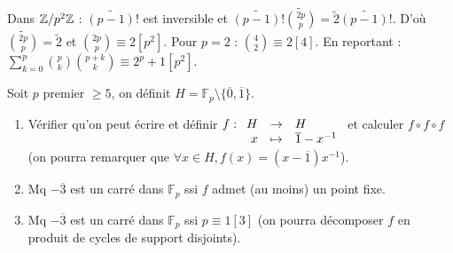 \begin{solution}
Dans $\mathbb Z/p^2\mathbb Z$ : $\widetilde{(p-1)!}$ est inversible et $\widetilde{(p-1)!} \widetilde{\binom{2p}{p}} = \widetilde{2} \widetilde{(p-1)!}$.
D'où $\widetilde{\binom{2p}{p}} = \widetilde{2}$ et $\binom{2p}{p} \equiv 2 [p^2]$.
Pour $p=2$ : $\binom{4}{2} \equiv 2 [4]$.
En reportant : $\boxed{\sum_{k=0}^p \binom{p}{k}\binom{p+k}{k} \equiv 2^p + 1 [p^2]}$.
\end{solution}


\begin{statementbox}
Soit $p$ premier $\geq 5$, on définit $H = \mathbb{F}_p \setminus \{\overline{0}, \overline{1}\}$.
\begin{enumerate}[label=\alph*)]
  \item Vérifier qu'on peut écrire et définir $f : \begin{array}[t]{rcl} H & \to & H \\ x & \mapsto & \overline{1} - x^{-1} \end{array}$ et calculer $f \circ f \circ f$ (on pourra remarquer que $\forall x \in H, f(x) = (x - \overline{1})x^{-1}$).
  \item Mq $-\overline{3}$ est un carré dans $\mathbb{F}_p$ ssi $f$ admet (au moins) un point fixe.
  \item Mq $-\overline{3}$ est un carré dans $\mathbb{F}_p$ ssi $p \equiv 1 [3]$ (on pourra décomposer $f$ en produit de cycles de support disjoints).
\end{enumerate}
\end{statementbox}

